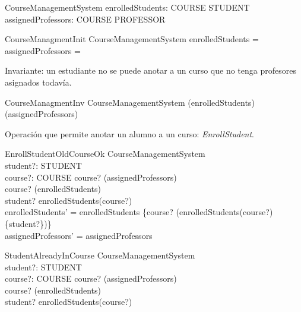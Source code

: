 \documentclass{article}
\begin{document}
\begin{zed}
\end{zed}

\begin{schema}{CourseManagementSystem}
    enrolledStudents: COURSE \pfun \power STUDENT \\
    assignedProfessors: COURSE \pfun \power PROFESSOR
\end{schema}

\begin{schema}{CourseManagmentInit}
CourseManagementSystem
\where
    enrolledStudents = \emptyset \\
    assignedProfessors = \emptyset
\end{schema}

Invariante: un estudiante no se puede anotar a un curso que no tenga profesores asignados todavía.

\begin{schema}{CourseManagmentInv}
CourseManagementSystem
\where
    \dom(enrolledStudents) \subseteq \dom(assignedProfessors)
\end{schema}

Operación que permite anotar un alumno a un curso: \textit{EnrollStudent}.

\begin{schema}{EnrollStudentOldCourseOk}
    \Delta CourseManagementSystem \\
    student?: STUDENT \\
    course?: COURSE
    \where
    course? \in \dom(assignedProfessors) \\
    course? \in \dom(enrolledStudents) \\
    student? \notin enrolledStudents(course?) \\
    enrolledStudents' = enrolledStudents \oplus \{course? \mapsto (enrolledStudents(course?) \cup \{student?\})\} \\
    assignedProfessors' = assignedProfessors
\end{schema}

\begin{schema}{StudentAlreadyInCourse}
\Xi CourseManagementSystem \\
student?: STUDENT \\
course?: COURSE 
\where
    course? \in \dom(assignedProfessors) \\
    course? \in \dom(enrolledStudents) \\
    student? \in enrolledStudents(course?)
\end{schema}
\end{document}
